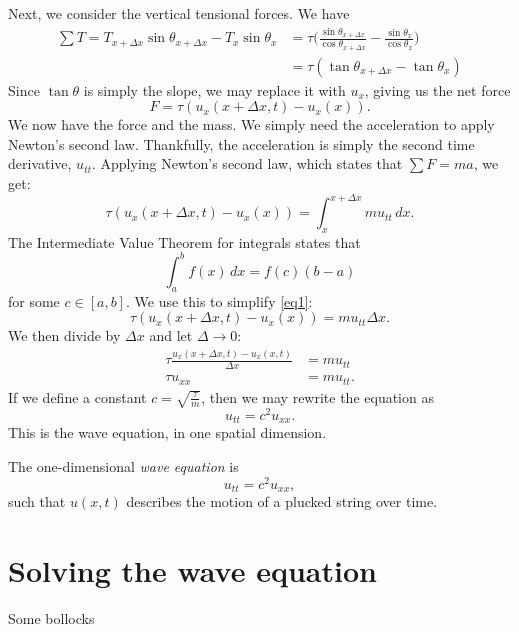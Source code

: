 \documentclass{amsart}
\begin{document}
  Next, we consider the vertical tensional forces. We have 
  \begin{align*}
    \sum T = T_{x+\Delta x} \sin \theta_{x+\Delta x} - T_{x} \sin \theta_{x} &= \tau \Big(\frac{\sin \theta_{x+\Delta x}}{\cos \theta_{x+\Delta x}} - \frac{\sin \theta_x}{\cos \theta_x} \Big) \\
                                                                             &= \tau (\tan \theta_{x + \Delta x} - \tan \theta_{x})
  \end{align*}
  Since $\tan \theta$ is simply the slope, we may replace it with $u_x$, giving us the net force \[
    F = \tau (u_{x}(x+\Delta x, t) - u_{x}(x))
  .\] 
  We now have the force and the mass. We simply need the acceleration to apply Newton's second law. Thankfully, the acceleration is simply the second time derivative, $u_{tt}$. Applying Newton's second law, which states that $\sum F = ma$, we get:
  \begin{equation}\label{eq1}
    \tau (u_{x}(x+\Delta x, t) - u_{x}(x)) = \int_{x}^{x+\Delta x} mu_{tt}\, dx . 
  \end{equation}
  The Intermediate Value Theorem for integrals states that \[
    \int_{a}^{b} f(x)\, dx = f(c)(b-a)
  \] for some $c \in [a, b]$. We use this to simplify \ref{eq1}: 
  \[
    \tau (u_{x}(x+\Delta x, t) - u_{x}(x)) = mu_{tt}\Delta x
  .\] We then divide by $\Delta x$ and let $\Delta \to 0$:
  \begin{align*}
    \tau \frac{u_x(x+\Delta x, t) - u_{x}(x, t)}{\Delta x} &= mu_{tt} \\
    \tau u_{xx} &= mu_{tt}.
  \end{align*}
  If we define a constant $c = \sqrt{\frac{\tau}{m}} $, then we may rewrite the equation as \[
    u_{tt} = c^2 u_{xx}
  .\] This is the wave equation, in one spatial dimension.
  \begin{definition}
    The one-dimensional \emph{wave equation} is \[
      u_{tt} = c^2u_{xx}
    ,\] such that $u(x, t)$ describes the motion of a plucked string over time.
  \end{definition}

  \section{Solving the wave equation}

  Some bollocks
\end{document}
